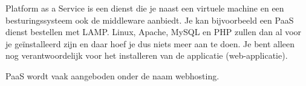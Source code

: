 Platform as a Service is een dienst die je naast een virtuele machine en een besturingssysteem ook de middleware aanbiedt. Je kan bijvoorbeeld een PaaS dienst bestellen met LAMP. Linux, Apache, MySQL en PHP zullen dan al voor je ge\"installeerd zijn en daar hoef je dus niets meer aan te doen. Je bent alleen nog verantwoordelijk voor het installeren van de applicatie (web-applicatie).

PaaS wordt vaak aangeboden onder de naam webhosting.
